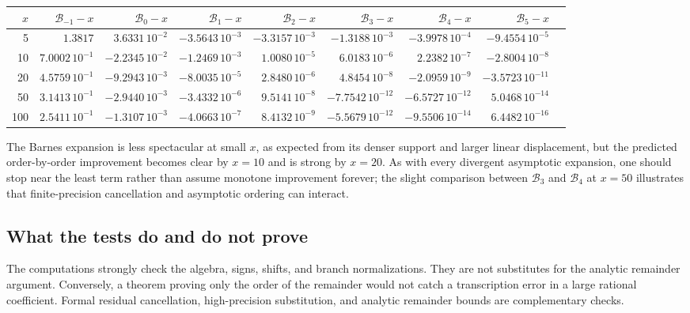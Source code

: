 \documentclass[11pt]{article}
\theoremstyle{definition}
\theoremstyle{remark}
\begin{document}
\begin{center}
\scriptsize
\setlength{\tabcolsep}{4.3pt}
\begin{tabular}{r@{\quad}rrrrrrrr}
\toprule
\(x\) & \(\mathcal B_{-1}-x\) & \(\mathcal B_0-x\) & \(\mathcal B_1-x\)
& \(\mathcal B_2-x\) & \(\mathcal B_3-x\) & \(\mathcal B_4-x\) & \(\mathcal B_5-x\)\\
\midrule
5
& \(1.3817\) & \(3.6331\,10^{-2}\) & \(-3.5643\,10^{-3}\)
& \(-3.3157\,10^{-3}\) & \(-1.3188\,10^{-3}\) & \(-3.9978\,10^{-4}\) & \(-9.4554\,10^{-5}\)\\
10
& \(7.0002\,10^{-1}\) & \(-2.2345\,10^{-2}\) & \(-1.2469\,10^{-3}\)
& \(1.0080\,10^{-5}\) & \(6.0183\,10^{-6}\) & \(2.2382\,10^{-7}\) & \(-2.8004\,10^{-8}\)\\
20
& \(4.5759\,10^{-1}\) & \(-9.2943\,10^{-3}\) & \(-8.0035\,10^{-5}\)
& \(2.8480\,10^{-6}\) & \(4.8454\,10^{-8}\) & \(-2.0959\,10^{-9}\) & \(-3.5723\,10^{-11}\)\\
50
& \(3.1413\,10^{-1}\) & \(-2.9440\,10^{-3}\) & \(-3.4332\,10^{-6}\)
& \(9.5141\,10^{-8}\) & \(-7.7542\,10^{-12}\) & \(-6.5727\,10^{-12}\) & \(5.0468\,10^{-14}\)\\
100
& \(2.5411\,10^{-1}\) & \(-1.3107\,10^{-3}\) & \(-4.0663\,10^{-7}\)
& \(8.4132\,10^{-9}\) & \(-5.5679\,10^{-12}\) & \(-9.5506\,10^{-14}\) & \(6.4482\,10^{-16}\)\\
\bottomrule
\end{tabular}
\end{center}

The Barnes expansion is less spectacular at small \(x\), as expected from its denser support and larger linear displacement, but the predicted order-by-order improvement becomes clear by \(x=10\) and is strong by \(x=20\).  As with every divergent asymptotic expansion, one should stop near the least term rather than assume monotone improvement forever; the slight comparison between \(\mathcal B_3\) and \(\mathcal B_4\) at \(x=50\) illustrates that finite-precision cancellation and asymptotic ordering can interact.

\subsection{What the tests do and do not prove}

The computations strongly check the algebra, signs, shifts, and branch normalizations.  They are not substitutes for the analytic remainder argument.  Conversely, a theorem proving only the order of the remainder would not catch a transcription error in a large rational coefficient.  Formal residual cancellation, high-precision substitution, and analytic remainder bounds are complementary checks.
\end{document}
